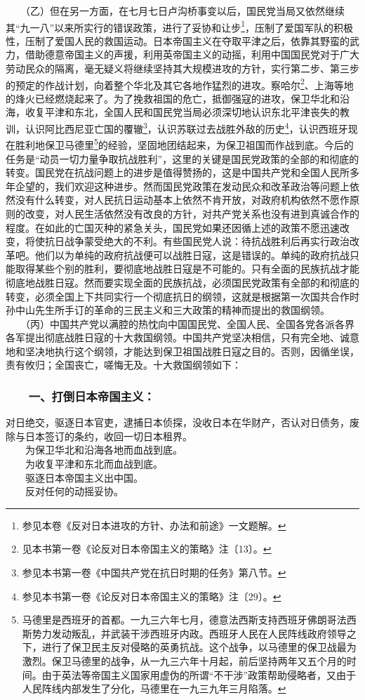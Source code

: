 \documentclass[cn,11pt,chinese]{elegantbook}
\def\myformat#1{\hfil\hfil #1}
\begin{document}
　　（乙）但在另一方面，在七月七日卢沟桥事变以后，国民党当局又依然继续其“九一八”以来所实行的错误政策，进行了妥协和让步\footnote[5]{ 参见本卷《反对日本进攻的方针、办法和前途》一文题解。}，压制了爱国军队的积极性，压制了爱国人民的救国运动。日本帝国主义在夺取平津之后，依靠其野蛮的武力，借助德意帝国主义的声援，利用英帝国主义的动摇，利用中国国民党对于广大劳动民众的隔离，毫无疑义将继续坚持其大规模进攻的方针，实行第二步、第三步的预定的作战计划，向着整个华北及其它各地作猛烈的进攻。察哈尔\footnote[6]{ 见本书第一卷《论反对日本帝国主义的策略》注〔13〕。}、上海等地的烽火已经燃烧起来了。为了挽救祖国的危亡，抵御强寇的进攻，保卫华北和沿海，收复平津和东北，全国人民和国民党当局必须深切地认识东北平津丧失的教训，认识阿比西尼亚亡国的覆辙\footnote[7]{ 参见本书第一卷《中国共产党在抗日时期的任务》第八节。}，认识苏联过去战胜外敌的历史\footnote[8]{ 参见本书第一卷《论反对日本帝国主义的策略》注〔29〕。}，认识西班牙现在胜利地保卫马德里\footnote[9]{ 马德里是西班牙的首都。一九三六年七月，德意法西斯支持西班牙佛朗哥法西斯势力发动叛乱，并武装干涉西班牙内政。西班牙人民在人民阵线政府领导之下，进行了保卫民主反对侵略的英勇抗战。这个战争，以马德里的保卫战最为激烈。保卫马德里的战争，从一九三六年十月起，前后坚持两年又五个月的时间。由于英法等帝国主义国家用虚伪的所谓“不干涉”政策帮助侵略者，又由于人民阵线内部发生了分化，马德里在一九三九年三月陷落。}的经验，坚固地团结起来，为保卫祖国而作战到底。今后的任务是“动员一切力量争取抗战胜利”，这里的关键是国民党政策的全部的和彻底的转变。国民党在抗战问题上的进步是值得赞扬的，这是中国共产党和全国人民所多年企望的，我们欢迎这种进步。然而国民党政策在发动民众和改革政治等问题上依然没有什么转变，对人民抗日运动基本上依然不肯开放，对政府机构依然不愿作原则的改变，对人民生活依然没有改良的方针，对共产党关系也没有进到真诚合作的程度。在如此的亡国灭种的紧急关头，国民党如果还因循上述的政策不愿迅速改变，将使抗日战争蒙受绝大的不利。有些国民党人说：待抗战胜利后再实行政治改革吧。他们以为单纯的政府抗战便可以战胜日寇，这是错误的。单纯的政府抗战只能取得某些个别的胜利，要彻底地战胜日寇是不可能的。只有全面的民族抗战才能彻底地战胜日寇。然而要实现全面的民族抗战，必须国民党政策有全部的和彻底的转变，必须全国上下共同实行一个彻底抗日的纲领，这就是根据第一次国共合作时孙中山先生所手订的革命的三民主义和三大政策的精神而提出的救国纲领。\\
　　（丙）中国共产党以满腔的热忱向中国国民党、全国人民、全国各党各派各界各军提出彻底战胜日寇的十大救国纲领。中国共产党坚决相信，只有完全地、诚意地和坚决地执行这个纲领，才能达到保卫祖国战胜日寇之目的。否则，因循坐误，责有攸归；全国丧亡，嗟悔无及。十大救国纲领如下：\\
\subsubsection*{\myformat{　　一、打倒日本帝国主义：}}
对日绝交，驱逐日本官吏，逮捕日本侦探，没收日本在华财产，否认对日债务，废除与日本签订的条约，收回一切日本租界。\\
　　为保卫华北和沿海各地而血战到底。\\
　　为收复平津和东北而血战到底。\\
　　驱逐日本帝国主义出中国。\\
　　反对任何的动摇妥协。\\
\end{document}
